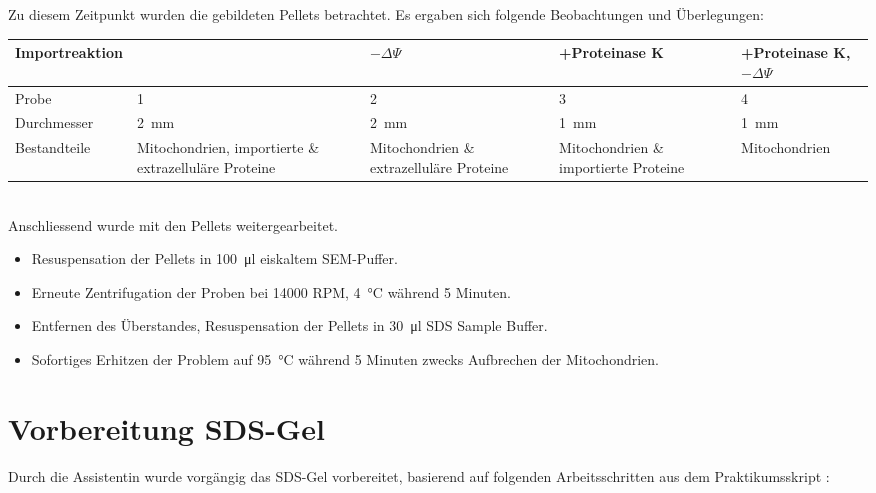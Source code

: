\documentclass[a4paper,german]{scrreprt}
\begin{document}
Zu diesem Zeitpunkt wurden die gebildeten Pellets betrachtet. Es ergaben sich
folgende Beobachtungen und Überlegungen:
\\

\begin{tabu}{lp{2.5cm}p{2.5cm}p{2.5cm}p{2.5cm}}
	\toprule
	Importreaktion & & $-\Delta\Psi$ & +Proteinase K & +Proteinase K, $-\Delta\Psi$ \\
	\midrule
	Probe & 1 & 2 & 3 & 4 \\
	Durchmesser & \SI{2}{mm} & \SI{2}{mm} & \SI{1}{mm} & \SI{1}{mm} \\
	Bestandteile & Mitochondrien, importierte \& extrazelluläre Proteine & Mitochondrien \& extrazelluläre Proteine & Mitochondrien \& importierte Proteine & Mitochondrien \\
	\bottomrule
\end{tabu}
\\

Anschliessend wurde mit den Pellets weitergearbeitet.

\begin{itemize}
	\item Resuspensation der Pellets in \SI{100}{\ul} eiskaltem SEM-Puffer.
	\item Erneute Zentrifugation der Proben bei 14000 RPM, \SI{4}{\celsius} während 5 Minuten.
	\item Entfernen des Überstandes, Resuspensation der Pellets in \SI{30}{\ul} SDS Sample Buffer.
	\item Sofortiges Erhitzen der Problem auf \SI{95}{\celsius} während 5
		Minuten zwecks Aufbrechen der Mitochondrien.

\end{itemize}

\section{Vorbereitung SDS-Gel}

Durch die Assistentin wurde vorgängig das SDS-Gel vorbereitet, basierend auf
folgenden Arbeitsschritten aus dem Praktikumsskript \cite{skriptv7}:
\end{document}
